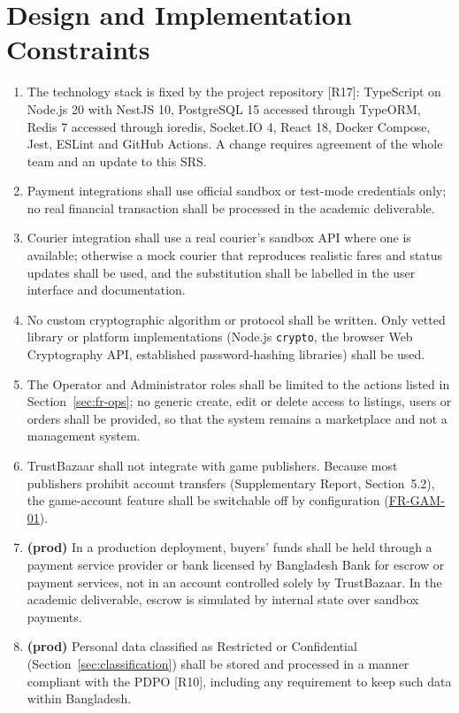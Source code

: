 \documentclass[11pt,a4paper]{report}
\newcommand{\rr}[1]{\hyperlink{#1}{#1}}
\begin{document}
\section{Design and Implementation Constraints}
\begin{enumerate}[label=\textbf{C-\arabic*}, nosep, leftmargin=*]
    \item The technology stack is fixed by the project repository [R17]: TypeScript on Node.js 20 with NestJS 10, PostgreSQL 15 accessed through TypeORM, Redis 7 accessed through ioredis, Socket.IO 4, React 18, Docker Compose, Jest, ESLint and GitHub Actions. A change requires agreement of the whole team and an update to this SRS.
    \item Payment integrations shall use official sandbox or test-mode credentials only; no real financial transaction shall be processed in the academic deliverable.
    \item Courier integration shall use a real courier's sandbox API where one is available; otherwise a mock courier that reproduces realistic fares and status updates shall be used, and the substitution shall be labelled in the user interface and documentation.
    \item No custom cryptographic algorithm or protocol shall be written. Only vetted library or platform implementations (Node.js \texttt{crypto}, the browser Web Cryptography API, established password-hashing libraries) shall be used.
    \item The Operator and Administrator roles shall be limited to the actions listed in Section~\ref{sec:fr-ops}; no generic create, edit or delete access to listings, users or orders shall be provided, so that the system remains a marketplace and not a management system.
    \item TrustBazaar shall not integrate with game publishers. Because most publishers prohibit account transfers (Supplementary Report, Section~5.2), the game-account feature shall be switchable off by configuration (\rr{FR-GAM-01}).
    \item \textbf{(prod)} In a production deployment, buyers' funds shall be held through a payment service provider or bank licensed by Bangladesh Bank for escrow or payment services, not in an account controlled solely by TrustBazaar. In the academic deliverable, escrow is simulated by internal state over sandbox payments.
    \item \textbf{(prod)} Personal data classified as Restricted or Confidential (Section~\ref{sec:classification}) shall be stored and processed in a manner compliant with the PDPO [R10], including any requirement to keep such data within Bangladesh.
\end{enumerate}
\end{document}
